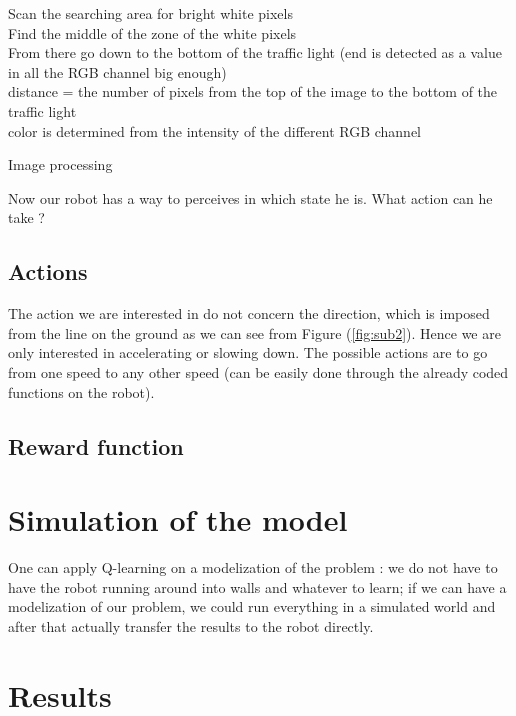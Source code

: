 \documentclass[14pt,a4paper]{article}
\theoremstyle{definition}
\begin{document}
\begin{algorithm}
    
	
	Scan the searching area for bright white pixels\\
	Find the middle of the zone of the white pixels\\
    From there go down to the bottom of the traffic light (end is detected as a value in all the RGB channel big enough)\\
    distance = the number of pixels from the top of the image to the bottom of the traffic light\\
    color is determined from the intensity of the different RGB channel
	\caption{Image processing}
	\label{detection_image}
\end{algorithm}

Now our robot has a way to perceives in which state he is. What action can he take ? 


\subsection{Actions}
The action we are interested in do not concern the direction, which is imposed from the line on the ground as we can see from Figure (\ref{fig:sub2}). Hence we are only interested in accelerating or slowing down. The possible actions are to go from one speed to any other speed (can be easily done through the already coded functions on the robot).
\subsection{Reward function}

\section{Simulation of the model}

One can apply Q-learning on a modelization of the problem : we do not have to have the robot running around into walls and whatever to learn; if we can have a modelization of our problem, we could run everything in a simulated world and after that actually transfer the results to the robot directly.
\section{Results}
















\nocite{Watkins_phd}
\newpage
{}




\end{document}
